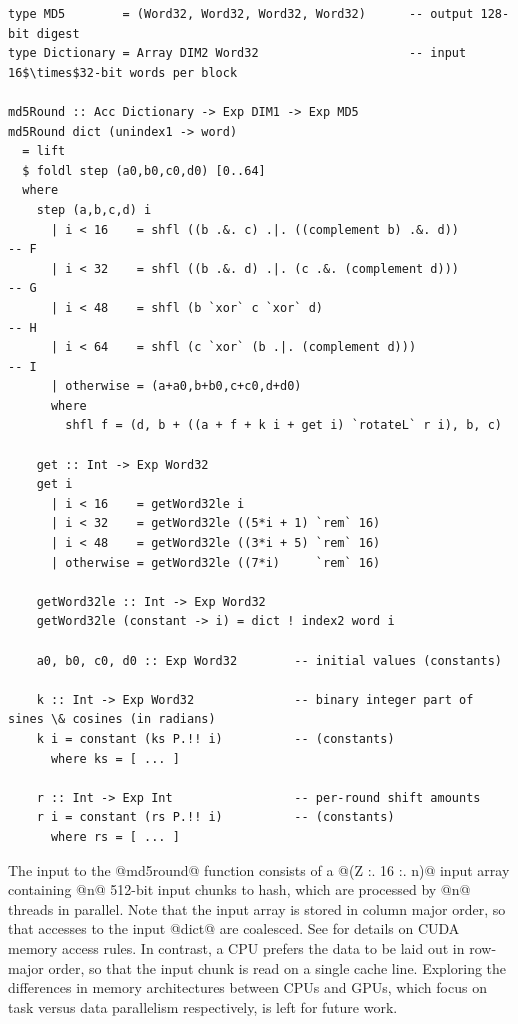 \begin{lstlisting}[style=haskell_float
    ,label=lst:md5
    ,caption={A single round of the MD5 hash algorithm}]
type MD5        = (Word32, Word32, Word32, Word32)      -- output 128-bit digest
type Dictionary = Array DIM2 Word32                     -- input 16$\times$32-bit words per block

md5Round :: Acc Dictionary -> Exp DIM1 -> Exp MD5
md5Round dict (unindex1 -> word)
  = lift
  $ foldl step (a0,b0,c0,d0) [0..64]
  where
    step (a,b,c,d) i
      | i < 16    = shfl ((b .&. c) .|. ((complement b) .&. d))         -- F
      | i < 32    = shfl ((b .&. d) .|. (c .&. (complement d)))         -- G
      | i < 48    = shfl (b `xor` c `xor` d)                            -- H
      | i < 64    = shfl (c `xor` (b .|. (complement d)))               -- I
      | otherwise = (a+a0,b+b0,c+c0,d+d0)
      where
        shfl f = (d, b + ((a + f + k i + get i) `rotateL` r i), b, c)

    get :: Int -> Exp Word32
    get i
      | i < 16    = getWord32le i
      | i < 32    = getWord32le ((5*i + 1) `rem` 16)
      | i < 48    = getWord32le ((3*i + 5) `rem` 16)
      | otherwise = getWord32le ((7*i)     `rem` 16)

    getWord32le :: Int -> Exp Word32
    getWord32le (constant -> i) = dict ! index2 word i

    a0, b0, c0, d0 :: Exp Word32        -- initial values (constants)

    k :: Int -> Exp Word32              -- binary integer part of sines \& cosines (in radians)
    k i = constant (ks P.!! i)          -- (constants)
      where ks = [ ... ]

    r :: Int -> Exp Int                 -- per-round shift amounts
    r i = constant (rs P.!! i)          -- (constants)
      where rs = [ ... ]
\end{lstlisting}

The input to the @md5round@ function consists of a @(Z :. 16 :. n)@ input array
containing @n@ 512-bit input chunks to hash, which are processed by @n@ threads
in parallel. Note that the input array is stored in column major order, so that
accesses to the input @dict@ are coalesced. See \cite{NVIDIA:2012wf} for details
on CUDA memory access rules. In contrast, a CPU prefers the data to be laid out
in row-major order, so that the input chunk is read on a single cache line.
Exploring the differences in memory architectures between CPUs and GPUs, which
focus on task versus data parallelism respectively, is left for future work.

